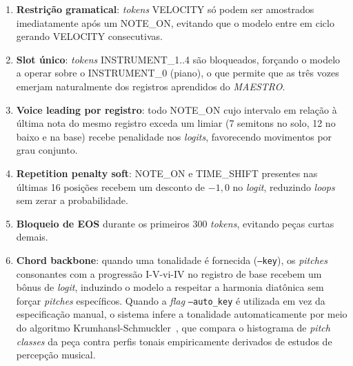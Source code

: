 \documentclass[12pt]{article}
\begin{document}
\begin{enumerate}
  \item \textbf{Restrição gramatical}: \emph{tokens} VELOCITY só podem ser
    amostrados imediatamente após um NOTE\_ON, evitando que o modelo entre em
    ciclo gerando VELOCITY consecutivas.
  \item \textbf{Slot único}: \emph{tokens} INSTRUMENT\_1..4 são bloqueados,
    forçando o modelo a operar sobre o INSTRUMENT\_0 (piano), o que permite que as
    três vozes emerjam naturalmente dos registros aprendidos do \emph{MAESTRO}.
  \item \textbf{Voice leading por registro}: todo NOTE\_ON cujo intervalo em
    relação à última nota do mesmo registro exceda um limiar (7 semitons no solo,
    12 no baixo e na base) recebe penalidade nos \emph{logits}, favorecendo
    movimentos por grau conjunto.
  \item \textbf{Repetition penalty soft}: NOTE\_ON e TIME\_SHIFT presentes nas
    últimas 16 posições recebem um desconto de $-1{,}0$ no \emph{logit}, reduzindo
    \emph{loops} sem zerar a probabilidade.
  \item \textbf{Bloqueio de EOS} durante os primeiros 300 \emph{tokens}, evitando
    peças curtas demais.
  \item \textbf{Chord backbone}: quando uma tonalidade é fornecida
    (\texttt{--key}), os \emph{pitches} consonantes com a progressão I-V-vi-IV no
    registro de base recebem um bônus de \emph{logit}, induzindo o modelo a
    respeitar a harmonia diatônica sem forçar \emph{pitches} específicos. Quando a
    \emph{flag} \texttt{--auto\_key} é utilizada em vez da especificação manual, o
    sistema infere a tonalidade automaticamente por meio do algoritmo
    Krumhansl-Schmuckler~\cite{krumhansl1982}, que compara o histograma de
    \emph{pitch classes} da peça contra perfis tonais empiricamente derivados de
    estudos de percepção musical.
\end{enumerate}
\end{document}
